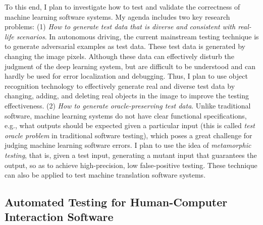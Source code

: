 \documentclass[a4paper]{article}
\begin{document}
To this end, I plan to investigate how to test and validate the correctness of machine learning software systems. 
My agenda includes two key research problems: (1) \emph{How to generate test data that is diverse and consistent with real-life scenarios}.
In autonomous driving, the current mainstream testing technique is to generate adversarial examples as test data. These test data is generated by changing the image pixels. Although these data can effectively disturb the judgment of the deep learning system, but are difficult to be understood and can hardly be used for error localization and debugging. 
Thus, I plan to use object recognition technology to effectively generate real and diverse test data by changing, adding, and deleting real objects in the image to improve the testing effectiveness.
(2) \emph{How to generate oracle-preserving test data}. Unlike traditional software, machine learning systems do not have clear functional specifications, e.g., what outputs should be expected given a particular input (this is called \emph{test oracle problem} in traditional software testing), which poses a great challenge for judging machine learning software errors. I plan to use the idea of \emph{metamorphic testing}, that is, given a test input, generating a mutant input that guarantees the output, so as to achieve high-precision, low false-positive testing. 
These technique can also be applied to test machine translation software systems.


\subsection{Automated Testing for Human-Computer Interaction Software}
\end{document}
